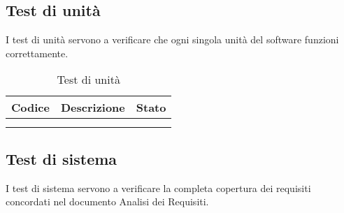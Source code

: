 \documentclass[10pt]{article}
\begin{document}
\begin{justify}
\subsection{Test di unità}
I test di unità servono a verificare che ogni singola unità del software funzioni correttamente.\\

\begin{longtable}{|>{\centering\arraybackslash}m{2cm}|>{\centering\arraybackslash}m{7cm}|>{\centering\arraybackslash}m{2cm}|}
\hline
\textbf{Codice} & \textbf{Descrizione} & \textbf{Stato}\\
\endhead
\hline
 & & \\
\hline
\caption{Test di unità}\\
\end{longtable}

\subsection{Test di sistema} %
I test di sistema servono a verificare la completa copertura dei requisiti concordati nel documento Analisi dei Requisiti.\\


\end{justify}
\end{document}
